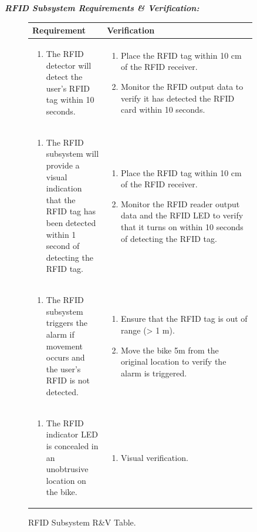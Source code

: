 \documentclass{article}
\begin{document}
\textit{\textbf{RFID Subsystem Requirements \& Verification:}}
\begin{figure}[H]
	\begin{center}
		\begin{tabular}{|p{0.3 \linewidth}|p{0.6 \linewidth}|}
			\hline
			Requirement & Verification  \\
			\hline
			\begin{enumerate}
				\item The RFID detector will detect the user’s RFID tag within 10 seconds. 
			\end{enumerate}  & \begin{enumerate} 
				\item Place the RFID tag within 10 cm of the RFID receiver. 
				\item Monitor the RFID output data to verify it has detected the RFID card within 10 seconds.
			\end{enumerate}
			\\
			\hline
			\begin{enumerate}
				\item The RFID subsystem will provide a visual indication that the RFID tag has been detected within 1 second of detecting the RFID tag. 
			\end{enumerate}  & \begin{enumerate}
				\item Place the RFID tag within 10 cm of the RFID receiver. 
				\item Monitor the RFID reader output data and the RFID LED to verify that it turns on within 10 seconds of detecting the RFID tag. 
			\end{enumerate} \\
			\hline
			\begin{enumerate}
				\item The RFID subsystem triggers the alarm if movement occurs and the user's RFID is not detected.
			\end{enumerate}  & \begin{enumerate}
				\item Ensure that the RFID tag is out of range (> 1 m).
				\item Move the bike 5m from the original location to verify the alarm is triggered.
			\end{enumerate} \\
			\hline
			\begin{enumerate}
				\item The RFID indicator LED is concealed in an unobtrusive location on the bike.
			\end{enumerate}  & \begin{enumerate}
				\item Visual verification.
			\end{enumerate} \\
			\hline
		\end{tabular}
	\end{center}
	\caption{RFID Subsystem R\&V Table.}
\end{figure}
\end{document}
